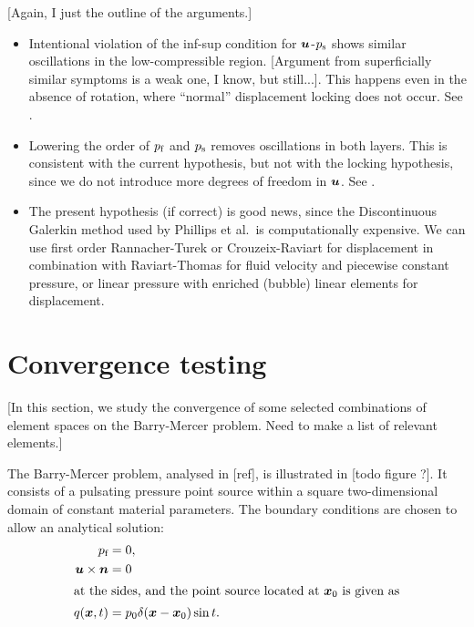 [Again, I just the outline of the arguments.]

\begin{itemize}
\item Intentional violation of the inf-sup condition for $\boldsymbol{u}$-$p_{\text{s}}$ shows similar oscillations in the
  low-compressible region. [Argument from superficially similar symptoms is a
  weak one, I know, but still...]. This happens even in
  the absence of rotation, where ``normal'' displacement locking does not
  occur. See .
\item Lowering the order of $p_{\text{f}}$ and $p_{\text{s}}$ removes oscillations in both
  layers. This is consistent with the current hypothesis, but not with the locking
  hypothesis, since we do not introduce more degrees of freedom in $\boldsymbol{u}$. See
  .
\item The present hypothesis (if correct) is good news, since the Discontinuous
  Galerkin method used by Phillips et al.~is computationally expensive. We can use first order
  Rannacher-Turek or Crouzeix-Raviart for displacement in combination with
  Raviart-Thomas for fluid velocity and piecewise constant pressure, or linear
  pressure with enriched (bubble) linear elements for displacement.
\end{itemize}



\section{Convergence testing}

[In this section, we study the convergence of some selected combinations of
  element spaces on the Barry-Mercer problem. Need to make a list of relevant
  elements.]

The Barry-Mercer problem, analysed in [ref], is illustrated in [todo figure ?].
It consists of a pulsating pressure point source within a square
two-dimensional domain of constant material parameters.
The boundary conditions are chosen to allow an analytical solution:
\begin{align*}
  p_{\text{f}} &= 0, \\
  \boldsymbol{u} \times \boldsymbol{n} &= 0\\
\intertext{at the sides, and the point source located at $\boldsymbol{x}_0$ is given as}
q(\boldsymbol{x},t) &= p_0 \delta(\boldsymbol{x}-\boldsymbol{x}_0) \sin t.
\end{align*}


